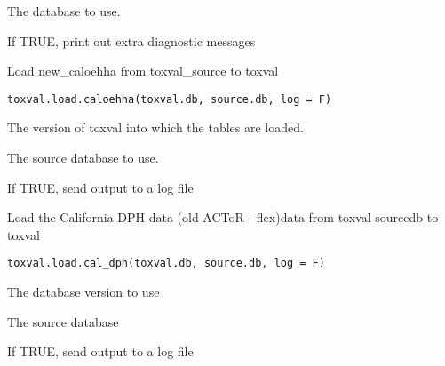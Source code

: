 \documentclass[letterpaper]{book}
\begin{document}
%
\begin{Arguments}
\begin{ldescription}
\item[\code{toxval.db}] The database to use.

\item[\code{verbose}] If TRUE, print out extra diagnostic messages
\end{ldescription}
\end{Arguments}
%
\begin{Description}\relax
Load new\_caloehha from toxval\_source to toxval
\end{Description}
%
\begin{Usage}
\begin{verbatim}
toxval.load.caloehha(toxval.db, source.db, log = F)
\end{verbatim}
\end{Usage}
%
\begin{Arguments}
\begin{ldescription}
\item[\code{toxval.db}] The version of toxval into which the tables are loaded.

\item[\code{source.db}] The source database to use.

\item[\code{log}] If TRUE, send output to a log file
\end{ldescription}
\end{Arguments}
%
\begin{Description}\relax
Load the California DPH data (old ACToR - flex)data  from toxval sourcedb to toxval
\end{Description}
%
\begin{Usage}
\begin{verbatim}
toxval.load.cal_dph(toxval.db, source.db, log = F)
\end{verbatim}
\end{Usage}
%
\begin{Arguments}
\begin{ldescription}
\item[\code{toxval.db}] The database version to use

\item[\code{source.db}] The source database

\item[\code{log}] If TRUE, send output to a log file
\end{ldescription}
\end{Arguments}
\end{document}
